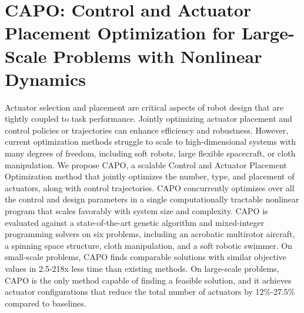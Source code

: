 \graphicspath{{sections/03_CAPO_Optimization/}}

\chapter{CAPO: Control and Actuator Placement Optimization for Large-Scale Problems with Nonlinear Dynamics}
%
%
Actuator selection and placement are critical aspects of robot design that are tightly coupled to task performance. Jointly optimizing actuator placement and control policies or trajectories can enhance efficiency and robustness. However, current optimization methods struggle to scale to high-dimensional systems with many degrees of freedom, including soft robots, large flexible spacecraft, or cloth manipulation.
We propose CAPO, a scalable Control and Actuator Placement Optimization method that jointly optimizes the number, type, and placement of actuators, along with control trajectories. CAPO concurrently optimizes over all the control and design parameters in a single computationally tractable nonlinear program that scales favorably with system size and complexity.
CAPO is evaluated against a state-of-the-art genetic algorithm and mixed-integer programming solvers on six problems, including an acrobatic multirotor aircraft, a spinning space structure, cloth manipulation, and a soft robotic swimmer. On small-scale problems, CAPO finds comparable solutions with similar objective values in 2.5-218x less time than existing methods. On large-scale problems, CAPO is the only method capable of finding a feasible solution, and it achieves actuator configurations that reduce the total number of actuators by 12\%-27.5\% compared to baselines.

